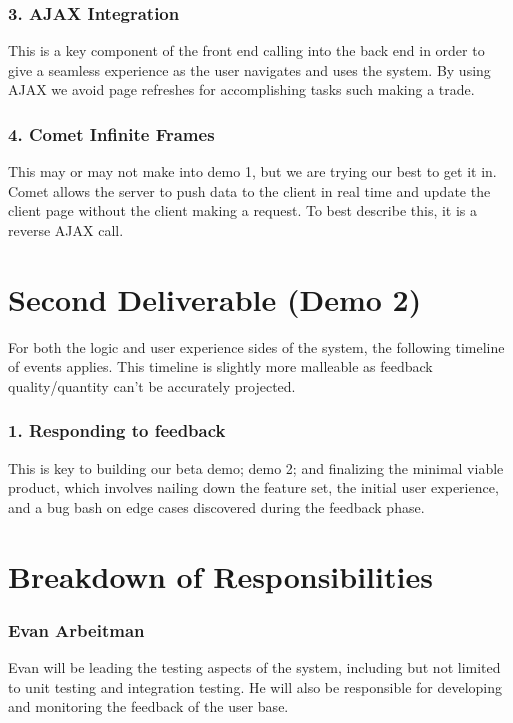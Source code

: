 \subsubsection{3. AJAX Integration}
This is a key component of the front end calling into the back end in order to
give a seamless experience as the user navigates and uses the system.  By using
AJAX we avoid page refreshes for accomplishing tasks such making a trade.\\
\subsubsection{4. Comet Infinite Frames}
This may or may not make into demo 1, but we are trying our best to get it in.
Comet\cite{wiki:comt} allows the server to push data to the client in real time
and update the client page without the client making a request. To best describe
this, it is a reverse AJAX call.

\section{Second Deliverable (Demo 2)}
For both the logic and user experience sides of the system, the following
timeline of events applies. This timeline is slightly more malleable as
feedback quality/quantity can’t be accurately projected. \\

\subsubsection{1. Responding to feedback}
This is key to building our beta demo; demo 2; and finalizing the minimal viable
product, which involves nailing down the feature set, the initial user experience,
and a bug bash on edge cases discovered during the feedback phase.\\

\section{Breakdown of Responsibilities}
\subsubsection{Evan Arbeitman}
Evan will be leading the testing aspects of the system, including but not
limited to unit testing and integration testing. He will also be responsible
for developing and monitoring the feedback of the user base.\\
